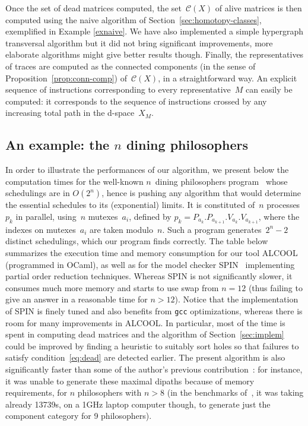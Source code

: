 \documentclass[orivec]{llncs} \usepackage[T1]{fontenc}
\newcommand{\C}{\mathcal{C}}
\renewcommand{\P}[1]{P_{#1}}
\newcommand{\V}[1]{V_{#1}}
\renewcommand{\C}{\mathcal{C}}
\begin{document}
Once the set of dead matrices computed, the set~$\C(X)$ of alive matrices is
then computed using the naive algorithm of Section~\ref{sec:homotopy-classes},
exemplified in Example \ref{exnaive}. We have also implemented a simple
hypergraph transversal algorithm \cite{Berge} but it did not bring significant
improvements, more elaborate algorithms might give better results
though. Finally, the representatives of traces are computed as the connected
components (in the sense of Proposition~\ref{prop:conn-comp}) of~$\C(X)$, in a
straightforward way. An explicit sequence of instructions corresponding to every
representative~$M$ can easily be computed: it corresponds to the sequence of
instructions crossed by any increasing total path in the d-space~$X_M$.


\subsection{An example: the $n$ dining philosophers}
\label{benchmarks}
In order to illustrate the performances of our algorithm, we present below the
computation times for the well-known $n$~dining philosophers
program~\cite{philosophers} whose schedulings are 
in $O(2^n)$, hence is pushing any algorithm that would determine the essential
schedules to its (exponential) limits.
It is constituted of~$n$
processes~$p_k$ in parallel, using~$n$ mutexes~$a_i$, defined by
\hbox{$p_k=\P{a_{k}}.\P{a_{k+1}}.\V{a_{k}}.\V{a_{k+1}}$}, where the indexes on
mutexes~$a_i$ are taken modulo~$n$. Such a program generates~$2^n-2$ distinct
schedulings, which our program finds correctly. The table below summarizes the
execution time and memory consumption for our tool \hbox{ALCOOL} (programmed in
OCaml), as well as for the model checker SPIN~\cite{spin} implementing partial
order reduction techniques. Whereas SPIN is not significantly slower, it consumes
much more memory and starts to use swap from $n=12$ (thus failing to give an
answer in a reasonable time for $n>12$). Notice that the implementation of SPIN
is finely tuned and also benefits from \texttt{gcc} optimizations, whereas there
is room for many improvements in ALCOOL. In particular, most of the time is
spent in computing dead matrices and the algorithm of Section~\ref{sec:implem}
could be improved by finding a heuristic to suitably sort holes so that failures
to satisfy condition~\eqref{eq:dead} are detected earlier. The present algorithm
is also significantly faster than some of the author's previous
contribution~\cite{concur05}: for instance, it was unable to generate these
maximal dipaths because of memory requirements, for $n$ philosophers with $n>8$
(in the benchmarks of~\cite{concur05}, it was taking already 13739s, on a 1GHz
laptop computer though, to generate just the component category for 9
philosophers).
\end{document}
